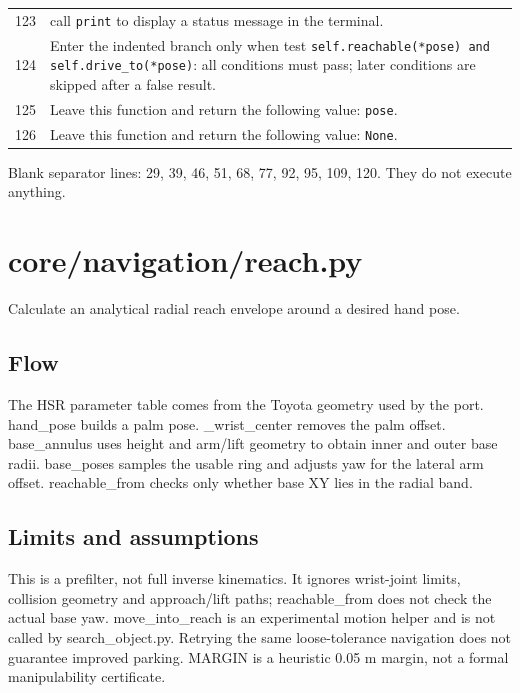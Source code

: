 \documentclass[11pt,a4paper]{book}
\begin{document}
\begin{longtable}{r p{}}
123 & call \texttt{print} to display a status message in the terminal. \\

124 & Enter the indented branch only when test \texttt{self.reachable(*pose) and self.drive\_to(*pose)}: all conditions must pass; later conditions are skipped after a false result. \\

125 & Leave this function and return the following value: \texttt{pose}. \\

126 & Leave this function and return the following value: \texttt{None}. \\

\end{longtable}

Blank separator lines: 29, 39, 46, 51, 68, 77, 92, 95, 109, 120. They do not execute anything.

\chapter{core/navigation/reach.py}

Calculate an analytical radial reach envelope around a desired hand pose.

\section*{Flow}

The HSR parameter table comes from the Toyota geometry used by the port. hand\_pose builds a palm pose. \_wrist\_center removes the palm offset. base\_annulus uses height and arm/lift geometry to obtain inner and outer base radii. base\_poses samples the usable ring and adjusts yaw for the lateral arm offset. reachable\_from checks only whether base XY lies in the radial band.

\section*{Limits and assumptions}

This is a prefilter, not full inverse kinematics. It ignores wrist-joint limits, collision geometry and approach/lift paths; reachable\_from does not check the actual base yaw. move\_into\_reach is an experimental motion helper and is not called by search\_object.py. Retrying the same loose-tolerance navigation does not guarantee improved parking. MARGIN is a heuristic 0.05 m margin, not a formal manipulability certificate.
\end{document}
